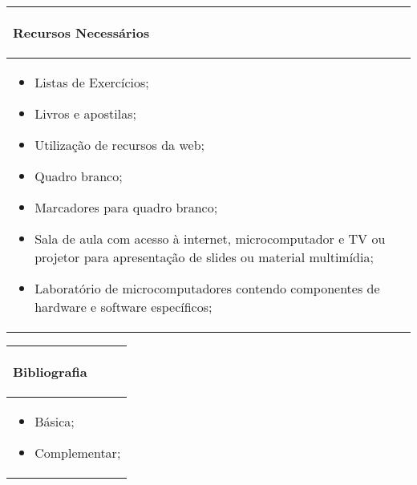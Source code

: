 \begin{table}[h!]
\centering

\begin{small} 
  
\setlength{\tabcolsep}{3pt} 
\begin{tabular}{|p{15cm}|}\hline

\begin{center}\textbf{Recursos Necessários}\end{center}\\ \hline
\begin{itemize} 
  \item Listas de Exercícios;
  \item Livros e apostilas;
  \item Utilização de recursos da web;
  \item Quadro branco;
  \item Marcadores para quadro branco;
  \item Sala de aula com acesso à internet, microcomputador e TV ou projetor para apresentação de slides ou material multimídia;
  \item Laboratório de microcomputadores contendo componentes de hardware e software específicos;
\end{itemize}
 \\ \hline
\end{tabular} 
\end{small}
\label{dadosinstituicao}
\end{table}


\begin{table}[h!]
\centering

\begin{small} 
  
\setlength{\tabcolsep}{3pt} 
\begin{tabular}{|p{15cm}|}\hline

\begin{center}\textbf{Bibliografia}\end{center}\\ \hline
\begin{itemize} 
  \item Básica;
  \item Complementar;
\end{itemize}
 \\ \hline
\end{tabular} 
\end{small}
\label{dadosinstituicao}
\end{table}
